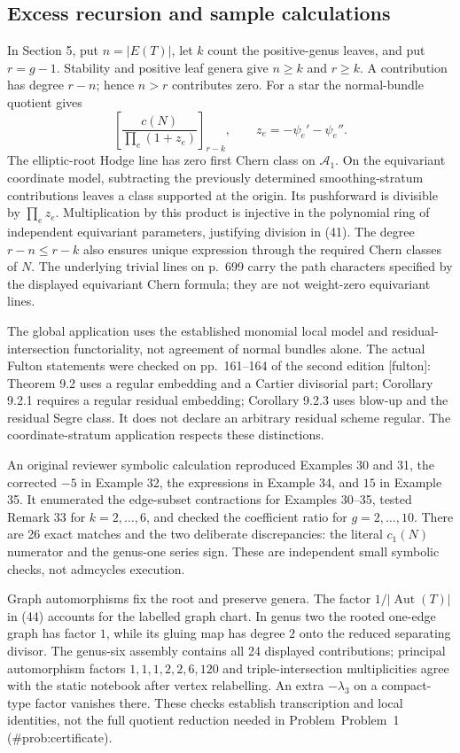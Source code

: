 \documentclass[10pt]{article}
\begin{document}
\subsection*{Excess recursion and sample calculations}
In Section 5, put \(n=|E(T)|\), let \(k\) count the positive-genus leaves, and put \(r=g-1\). Stability and positive leaf genera give \(n\ge k\) and \(r\ge k\). A contribution has degree \(r-n\); hence \(n>r\) contributes zero. For a star the normal-bundle quotient gives \[\left[\frac{c(N)}{\prod_e(1+z_e)}\right]_{r-k},
             \qquad z_e=-\psi_e'-\psi_e''.\] The elliptic-root Hodge line has zero first Chern class on \(\mathcal A_1\). On the equivariant coordinate model, subtracting the previously determined smoothing-stratum contributions leaves a class supported at the origin. Its pushforward is divisible by \(\prod_e z_e\). Multiplication by this product is injective in the polynomial ring of independent equivariant parameters, justifying division in (41). The degree \(r-n\le r-k\) also ensures unique expression through the required Chern classes of \(N\). The underlying trivial lines on p. 699 carry the path characters specified by the displayed equivariant Chern formula; they are not weight-zero equivariant lines.\par
The global application uses the established monomial local model and residual-intersection functoriality, not agreement of normal bundles alone. The actual Fulton statements were checked on pp. 161–164 of the second edition [fulton]: Theorem 9.2 uses a regular embedding and a Cartier divisorial part; Corollary 9.2.1 requires a regular residual embedding; Corollary 9.2.3 uses blow-up and the residual Segre class. It does not declare an arbitrary residual scheme regular. The coordinate-stratum application respects these distinctions.\par
An original reviewer symbolic calculation reproduced Examples 30 and 31, the corrected \(-5\) in Example 32, the expressions in Example 34, and \(15\) in Example 35. It enumerated the edge-subset contractions for Examples 30–35, tested Remark 33 for \(k=2,\ldots,6\), and checked the coefficient ratio for \(g=2,\ldots,10\). There are 26 exact matches and the two deliberate discrepancies: the literal \(c_1(N)\) numerator and the genus-one series sign. These are independent small symbolic checks, not admcycles execution.\par
Graph automorphisms fix the root and preserve genera. The factor \(1/|\operatorname{Aut}(T)|\) in (44) accounts for the labelled graph chart. In genus two the rooted one-edge graph has factor \(1\), while its gluing map has degree \(2\) onto the reduced separating divisor. The genus-six assembly contains all 24 displayed contributions; principal automorphism factors \(1,1,1,2,2,6,120\) and triple-intersection multiplicities agree with the static notebook after vertex relabelling. An extra \(-\lambda_3\) on a compact-type factor vanishes there. These checks establish transcription and local identities, not the full quotient reduction needed in Problem Problem 1 (\#prob:certificate).\par
\end{document}
